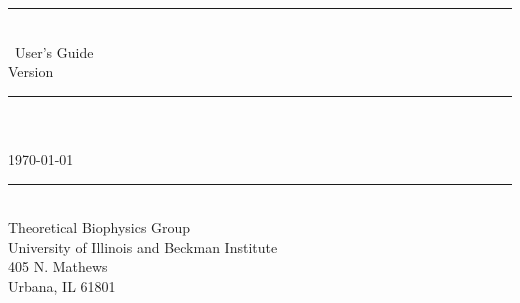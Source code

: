 
\thispagestyle{empty}

\vspace*{0.3in}

\begin{centering}
  \rule{6in}{0.04in}				\\	\vspace{0.25in}
  {\Huge \PSFGEN\ User's Guide}			\\	\vspace{0.25in}
  {\Large Version \PSFGENVER}			\\	\vspace{0.20in}
  \rule{6in}{0.04in}				\\	\vspace{0.25in}
  {\Large \PSFGENAUTHORS}			\\	\vspace{0.20in}
  \today					\\	\vspace{0.20in}
  \rule{6in}{0.04in}				\\	\vspace{0.25in}
  {\large       Theoretical Biophysics Group}                  \\ 
  {\large       University of Illinois and Beckman Institute}  \\ 
  {\large       405 N. Mathews}                                \\ 
  {\large       Urbana, IL  61801}                             \\
\end{centering}
\vspace{0.2in}


